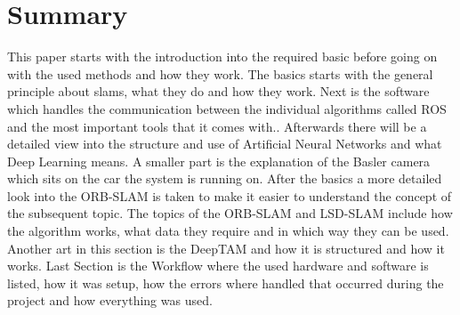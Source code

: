 

\chapter*{Summary}

This paper starts with the introduction into the required basic before going on with the used methods and how they work. \newline
The basics starts with the general principle about  \gls{slam}s, what they do and how they work. Next is the software which handles the communication between the individual algorithms called ROS and the most important tools that it comes with.. Afterwards there will be a detailed view into the structure and use of Artificial Neural Networks and what Deep Learning means. A smaller part is the explanation of the Basler camera which sits on the car the system is running on. \newline
After the basics a more detailed look into the ORB-SLAM is taken to make it easier to understand the concept of the subsequent topic. The topics of the ORB-SLAM and LSD-SLAM include how the algorithm works, what data they require and in which way they can be used. Another art in this section is the DeepTAM and how it is structured and how it works. \newline
Last Section is the Workflow where the used hardware and software is listed, how it was setup, how the errors where handled that occurred during the project and how everything was used.